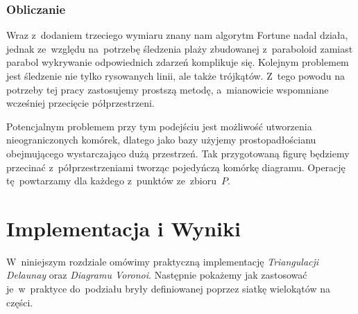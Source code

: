 \documentclass[skorowidz,autorrok,backref,xodstep,oswiadczenie]{wmimgr}
\begin{document}
\subsection{Obliczanie}

Wraz z~dodaniem trzeciego wymiaru znany nam algorytm Fortune nadal działa, jednak ze~względu na~potrzebę śledzenia plaży zbudowanej z~paraboloid zamiast parabol wykrywanie odpowiednich zdarzeń komplikuje się. Kolejnym problemem jest śledzenie nie tylko rysowanych linii, ale także trójkątów. Z~tego powodu na potrzeby tej pracy zastosujemy prostszą metodę, a~mianowicie wspomniane wcześniej przecięcie półprzestrzeni.

Potencjalnym problemem przy tym podejściu jest możliwość utworzenia nieograniczonych komórek, dlatego jako bazy użyjemy prostopadłościanu obejmującego wystarczająco dużą przestrzeń. Tak przygotowaną figurę będziemy przecinać z~półprzestrzeniami tworząc pojedyńczą komórkę diagramu. Operację tę~powtarzamy dla każdego z~punktów ze~zbioru~$P$.

\chapter{Implementacja i Wyniki}

W~niniejszym rozdziale omówimy praktyczną implementację \emph{Triangulacji Delaunay} oraz \emph{Diagramu Voronoi}. Następnie pokażemy jak zastosować je~w~praktyce do~podziału bryły definiowanej poprzez siatkę wielokątów na części.
\end{document}
